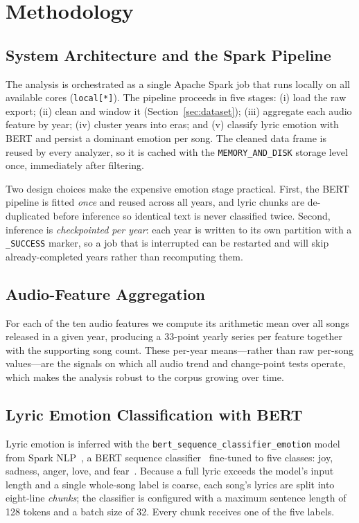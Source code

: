 \documentclass[conference]{IEEEtran}
\begin{document}
\section{Methodology}

\subsection{System Architecture and the Spark Pipeline}
The analysis is orchestrated as a single Apache Spark job that runs locally on
all available cores (\texttt{local[*]}). The pipeline proceeds in five stages:
(i) load the raw export; (ii) clean and window it (Section~\ref{sec:dataset});
(iii) aggregate each audio feature by year; (iv) cluster years into eras; and
(v) classify lyric emotion with BERT and persist a dominant emotion per song.
The cleaned data frame is reused by every analyzer, so it is cached with the
\texttt{MEMORY\_AND\_DISK} storage level once, immediately after filtering.

Two design choices make the expensive emotion stage practical. First, the BERT
pipeline is fitted \emph{once} and reused across all years, and lyric chunks are
de-duplicated before inference so identical text is never classified twice.
Second, inference is \emph{checkpointed per year}: each year is written to its
own partition with a \texttt{\_SUCCESS} marker, so a job that is interrupted can
be restarted and will skip already-completed years rather than recomputing them.

\subsection{Audio-Feature Aggregation}
For each of the ten audio features we compute its arithmetic mean over all songs
released in a given year, producing a 33-point yearly series per feature
together with the supporting song count. These per-year means---rather than raw
per-song values---are the signals on which all audio trend and change-point
tests operate, which makes the analysis robust to the corpus growing over time.

\subsection{Lyric Emotion Classification with BERT}
Lyric emotion is inferred with the \texttt{bert\_sequence\_classifier\_emotion}
model from Spark NLP~\cite{b_sparknlp}, a BERT sequence classifier~\cite{b_bert} fine-tuned to
five classes: joy, sadness, anger, love, and fear~\cite{b_emotion}. Because a
full lyric exceeds the model's input length and a single whole-song label is
coarse, each song's lyrics are split into eight-line \emph{chunks}; the
classifier is configured with a maximum sentence length of 128 tokens and a
batch size of 32. Every chunk receives one of the five labels.
\end{document}
